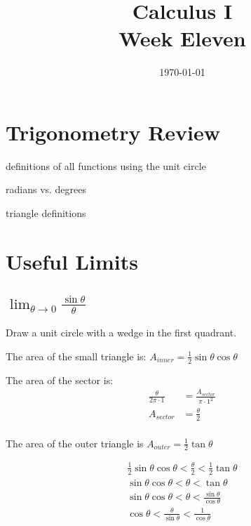\documentclass[letterpaper, landscape]{exam}
\author{}
\date{\today}
\title{Calculus I \\ Week Eleven}
\begin{document}
  \maketitle
  \tableofcontents

  \section{Trigonometry Review} %
  
  \begin{itemize*}
    \item definitions of all functions using the unit circle
    \item radians vs. degrees
    \item triangle definitions
  \end{itemize*}

  \section{Useful Limits} %
  
  \subsection{$\lim_{\theta \to 0} \frac{\sin \theta}{\theta}$} %
  
  Draw a unit circle with a wedge in the first quadrant. 

  The area of the small triangle is: $A_{inner} = \frac{1}{2} \sin
    \theta \cos \theta$

  The area of the sector is:
    \begin{align*}
      \frac{\theta}{2 \pi \cdot 1} &= \frac{A_{sector}}{\pi \cdot 1^2} \\
      A_{sector} &= \frac{\theta}{2} \\
    \end{align*}

  The area of the outer triangle is $A_{outer} = \frac{1}{2} \tan \theta$

  \begin{align*}
    \frac{1}{2} \sin \theta \cos \theta < \frac{\theta}{2} < \frac{1}{2} \tan \theta \\
    \sin \theta \cos \theta < \theta < \tan \theta \\
    \sin \theta \cos \theta < \theta < \frac{\sin \theta}{\cos \theta} \\
    \cos \theta < \frac{\theta}{\sin \theta} < \frac{1}{\cos \theta} \\
  \end{align*}
\end{document}
